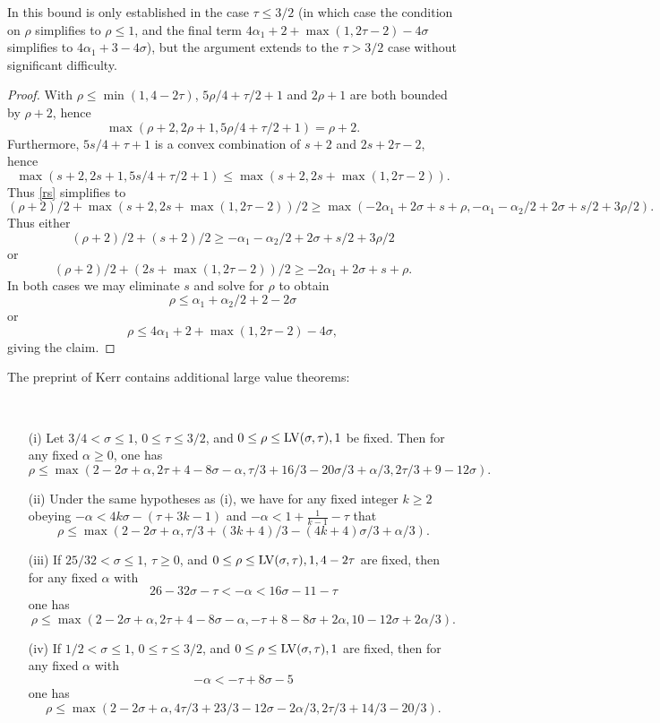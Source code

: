 In \cite{bourgain_large_2000} this bound is only established in the case $\tau \leq 3/2$ (in which case the condition on $\rho$ simplifies to $\rho \leq 1$, and the final term $4\alpha_1 + 2+\max(1,2\tau-2)-4\sigma$ simplifies to $4\alpha_1 + 3 -4\sigma$), but the argument extends to the $\tau > 3/2$ case without significant difficulty.

\begin{proof}  With $\rho \leq \min(1,4-2\tau)$, $5\rho/4+\tau/2+1$ and $2\rho+1$ are both bounded by $\rho+2$, hence
$$ \max(\rho+2, 2\rho+1, 5\rho/4 + \tau/2 + 1) = \rho+2.$$
Furthermore, $5s/4+\tau+1$ is a convex combination of $s+2$ and $2s + 2\tau-2$, hence
$$\max(s+2, 2s+1, 5s/4 + \tau/2 + 1) \leq \max(s+2, 2s + \max(1,2\tau-2)).$$
Thus \eqref{rs} simplifies to
$$(\rho+2)/2 + \max(s+2, 2s+\max(1,2\tau-2))/2 \geq
    \max( -2\alpha_1 + 2\sigma + s + \rho, -\alpha_1 - \alpha_2/2 + 2\sigma + s/2 + 3\rho/2).$$
Thus either
$$(\rho+2)/2 + (s+2)/2 \geq -\alpha_1 - \alpha_2/2 + 2\sigma + s/2 + 3\rho/2$$
or
$$(\rho+2)/2 + (2s+\max(1,2\tau-2))/2 \geq  -2\alpha_1 + 2\sigma + s + \rho.$$
In both cases we may eliminate $s$ and solve for $\rho$ to obtain
$$ \rho \leq \alpha_1 + \alpha_2/2 + 2 - 2 \sigma $$
or
$$ \rho \leq 4\alpha_1 + 2 + \max(1,2\tau-2) - 4 \sigma,$$
giving the claim.
\end{proof}


The preprint of Kerr \cite{kerr} contains additional large value theorems:

\begin{lemma}\label{kerr-thm}\
    \begin{itemize}
    \item[(i)]\cite[Theorem 2]{kerr} Let $3/4 < \sigma \leq 1$, $0 \leq \tau \leq 3/2$, and $0 \leq \rho \leq \mathrm{LV}(\sigma,\tau), 1$ be fixed.  Then for any fixed $\alpha \geq 0$, one has
    $$ \rho \leq \max( 2-2\sigma+\alpha, 2\tau+4-8\sigma-\alpha, \tau/3+16/3 -20\sigma/3 + \alpha/3, 2\tau/3+9-12\sigma).$$
    \item[(ii)] \cite[Theorem 3]{kerr} Under the same hypotheses as (i), we have for any fixed integer $k \geq 2$ obeying
    $-\alpha < 4k\sigma -(\tau+3k-1)$ and $-\alpha < 1 + \frac{1}{k-1} - \tau$ that
    $$ \rho \leq \max(2-2\sigma+\alpha, \tau/3+(3k+4)/3-(4k+4)\sigma/3 + \alpha/3).$$
    \item[(iii)] \cite[Theorem 4]{kerr} If $25/32 < \sigma \leq 1$, $\tau \geq 0$, and $0 \leq \rho \leq \mathrm{LV}(\sigma,\tau), 1, 4-2\tau$ are fixed, then for any fixed $\alpha$ with
    $$ 26 - 32 \sigma - \tau < - \alpha < 16\sigma -11-\tau$$
    one has
    $$ \rho \leq \max( 2-2\sigma+\alpha, 2\tau+4-8\sigma-\alpha, -\tau+8-8\sigma+2\alpha, 10-12\sigma+2\alpha/3).$$
    \item[(iv)] \cite[Theorem 5]{kerr} If $1/2 < \sigma \leq 1$, $0 \leq \tau \leq 3/2$, and $0 \leq \rho \leq \mathrm{LV}(\sigma,\tau), 1$ are fixed, then for any fixed $\alpha$ with
    $$ - \alpha < -\tau + 8\sigma - 5$$
    one has
    $$ \rho \leq \max(2-2\sigma+\alpha, 4\tau/3 +23/3 - 12\sigma - 2\alpha/3, 2\tau/3 + 14/3 - 20/3 ).$$
\end{itemize}
\end{lemma}
